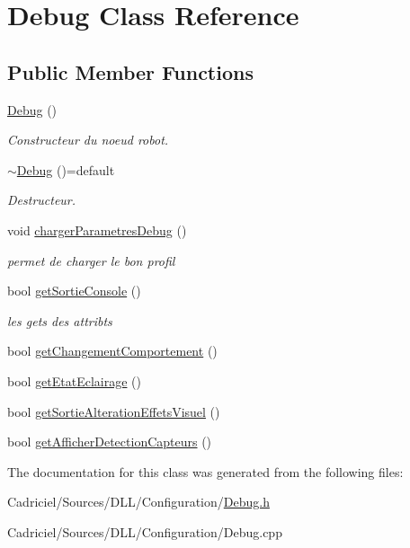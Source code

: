 \hypertarget{class_debug}{}\section{Debug Class Reference}
\label{class_debug}
\subsection*{Public Member Functions}
\begin{DoxyCompactItemize}
\item 
\hyperlink{group__inf2990_ga5b453c195c4cfffed2702c3330f53a64}{Debug} ()
\begin{DoxyCompactList}\small\item\em Constructeur du noeud robot. \end{DoxyCompactList}\item 
\hyperlink{class_debug_a1619b9b618cedfe7ad00eb8448c70dbd}{$\sim$\+Debug} ()=default\hypertarget{class_debug_a1619b9b618cedfe7ad00eb8448c70dbd}{}\label{class_debug_a1619b9b618cedfe7ad00eb8448c70dbd}

\begin{DoxyCompactList}\small\item\em Destructeur. \end{DoxyCompactList}\item 
void \hyperlink{group__inf2990_ga848d7b7972dc862d658ef56199ae7f1b}{charger\+Parametres\+Debug} ()
\begin{DoxyCompactList}\small\item\em permet de charger le bon profil \end{DoxyCompactList}\item 
bool \hyperlink{group__inf2990_ga5fa5cb128639746476faeb9acdae8960}{get\+Sortie\+Console} ()
\begin{DoxyCompactList}\small\item\em les gets des attribts \end{DoxyCompactList}\item 
bool \hyperlink{group__inf2990_ga5bab24788e48020082a328e2cfc7e2e3}{get\+Changement\+Comportement} ()
\item 
bool \hyperlink{group__inf2990_ga4e6a2ffa32e030b34d0c9caf91b72e06}{get\+Etat\+Eclairage} ()
\item 
bool \hyperlink{group__inf2990_ga2ecd4f482ca3f4f72a0c96dfec0700f3}{get\+Sortie\+Alteration\+Effets\+Visuel} ()
\item 
bool \hyperlink{group__inf2990_gaeace4e6d62ced2d397c3fe65055656d4}{get\+Afficher\+Detection\+Capteurs} ()
\end{DoxyCompactItemize}


The documentation for this class was generated from the following files\+:\begin{DoxyCompactItemize}
\item 
Cadriciel/\+Sources/\+D\+L\+L/\+Configuration/\hyperlink{_debug_8h}{Debug.\+h}\item 
Cadriciel/\+Sources/\+D\+L\+L/\+Configuration/Debug.\+cpp\end{DoxyCompactItemize}
